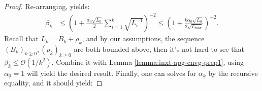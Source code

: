 \documentclass[12pt]{article}
\begin{document}
\begin{proof}
            Re-arranging, yields: 
            \begin{align*}
                \beta_k &\le 
                \left(
                    1 + \frac{\alpha_0\sqrt{L_0}}{2}\sum_{i = 1}^{k} \sqrt{L_i^{-1}}
                \right)^{-2}
                \le 
                \left(
                    1 + \frac{k\alpha_0\sqrt{L_0}}{2\sqrt{L_{\max}}}
                \right)^{-2}. 
            \end{align*}
            Recall that $L_k = B_k + \rho_k$, and by our assumptions, the sequence $(B_k)_{k \ge 0}, (\rho_k)_{k\ge 0}$ are both bounded above, then it's not hard to see that $\beta_k \le \mathcal O(1/k^2)$. 
            Combine it with Lemma \ref{lemma:inxt-apg-cnvg-prep1}, using $\alpha_0 = 1$ will yield the desired result. 
            Finally, one can solves for $\alpha_k$ by the recursive equality, and it should yield: 

        \end{proof}
\end{document}
